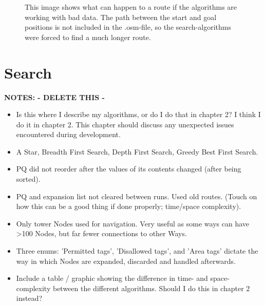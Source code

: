 \begin{figure}
	\centering
	\caption[Sup-optimal path due to bad data]{This image shows what can happen to a route if the algorithms are working with bad data. The path between the start and goal positions is not included in the .osm-file, so the search-algorithms were forced to find a much longer route.}
	\label{fig:badDataBadPath}
\end{figure}

\section{Search}
\textbf{NOTES: - DELETE THIS -}
\begin{itemize}
	\item Is this where I describe my algorithms, or do I do that in chapter 2?
	\subitem I think I do it in chapter 2. This chapter should discuss any unexpected issues encountered during development.
	\item A Star, Breadth First Search, Depth First Search, Greedy Best First Search.
	\item PQ did not reorder after the values of its contents changed (after being sorted).
	\item PQ and expansion list not cleared between runs. Used old routes. (Touch on how this can be a good thing if done properly; time/space complexity).
	\item Only tower Nodes used for navigation. Very useful as some ways can have >100 Nodes, but far fewer connections to other Ways.
	\item Three enums: 'Permitted tags', 'Disallowed tags', and 'Area tags' dictate the way in which Nodes are expanded, discarded and handled afterwards.
	\item Include a table / graphic showing the difference in time- and space-complexity between the different algorithms.
	\subitem Should I do this in chapter 2 instead?
\end{itemize}

